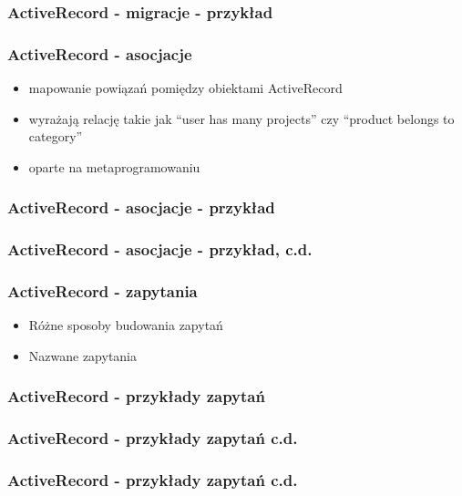 \documentclass[12t]{beamer}
\begin{document}
\begin{frame}[fragile]
  \frametitle{ActiveRecord - migracje - przykład}
  
\end{frame}

\begin{frame}
  \frametitle{ActiveRecord - asocjacje}
  \begin{itemize}
  \item mapowanie powiązań pomiędzy obiektami ActiveRecord
  \item wyrażają relację takie jak “user has many projects” czy
    “product belongs to category”
  \item oparte na metaprogramowaniu
  \end{itemize}
\end{frame}

\begin{frame}[fragile]
  \frametitle{ActiveRecord - asocjacje - przykład}
  
\end{frame}

\begin{frame}[fragile]
  \frametitle{ActiveRecord - asocjacje - przykład, c.d.}
  
\end{frame}

\begin{frame}
  \frametitle{ActiveRecord - zapytania}
  \begin{itemize}
  \item Różne sposoby budowania zapytań
  \item Nazwane zapytania
  \end{itemize}
\end{frame}

\begin{frame}[fragile]
  \frametitle{ActiveRecord - przykłady zapytań}
  \begin{footnotesize}
    
  \end{footnotesize}
\end{frame}

\begin{frame}[fragile]
  \frametitle{ActiveRecord - przykłady zapytań c.d.}
  \begin{footnotesize}
    
  \end{footnotesize}
\end{frame}

\begin{frame}[fragile]
  \frametitle{ActiveRecord - przykłady zapytań c.d.}
  \begin{small}
    
  \end{small}
\end{frame}
\end{document}
